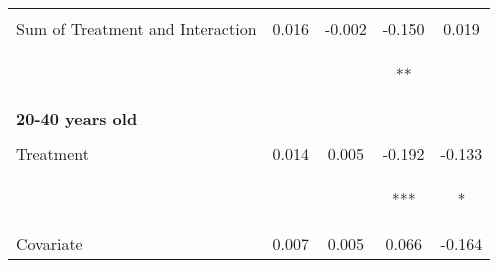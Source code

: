 \begin{tabular}{lcccc}
 & \begin{footnotesize}[0.018]\end{footnotesize} & \begin{footnotesize}[0.010]\end{footnotesize} & \begin{footnotesize}[0.104]\end{footnotesize} & \begin{footnotesize}[0.102]\end{footnotesize}\\
\noalign{\smallskip}Sum of Treatment and Interaction & 0.016 & -0.002 & -0.150 & 0.019\\
 & \begin{footnotesize}[0.013]\end{footnotesize} & \begin{footnotesize}[0.006]\end{footnotesize} & \begin{footnotesize}[0.074]**\end{footnotesize} & \begin{footnotesize}[0.070]\end{footnotesize}\\
\noalign{\smallskip}\textbf{20-40 years old} &  &  &  & \\
 & \begin{footnotesize}\end{footnotesize} & \begin{footnotesize}\end{footnotesize} & \begin{footnotesize}\end{footnotesize} & \begin{footnotesize}\end{footnotesize}\\
\noalign{\smallskip}Treatment & 0.014 & 0.005 & -0.192 & -0.133\\
 & \begin{footnotesize}[0.014]\end{footnotesize} & \begin{footnotesize}[0.006]\end{footnotesize} & \begin{footnotesize}[0.071]***\end{footnotesize} & \begin{footnotesize}[0.075]*\end{footnotesize}\\
\noalign{\smallskip}Covariate & 0.007 & 0.005 & 0.066 & -0.164\\

\end{tabular}
